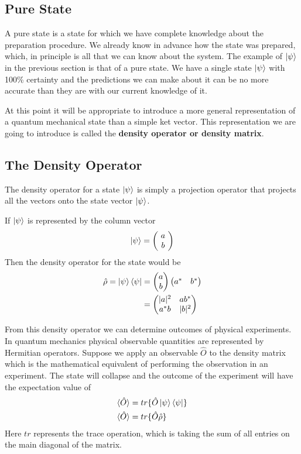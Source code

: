 \subsection{Pure State}
\par A pure state is a state for which we have complete knowledge about the preparation procedure. We already know in advance how the state was prepared, which, in principle is all that we can know about the system. The example of $\Ket{\psi}$ in the previous section is that of a pure state. We have a single state $\Ket{\psi}$ with 100\% certainty and the predictions we can make about it can be no more accurate than they are with our current knowledge of it.
\par At this point it will be appropriate to introduce a more general representation of a quantum mechanical state than a simple ket vector. This representation we are going to introduce is called the \textbf{density operator or density matrix}.
\subsection{The Density Operator}
\par The density operator for a state $\Ket{\psi}$ is simply a projection operator that projects all the vectors onto the state vector $\Ket{\psi}$.
\par If $\Ket{\psi}$ is represented by the column vector
\begin{align*}
\Ket{\psi} = \left(\! \begin{array}{c} a \\ b \end{array} \!\right)
\end{align*}
Then the density operator for the state would be
\begin{align*}
  \hat{\rho} = \Ket{\psi} \Bra{\psi} &= \begin{pmatrix} a \\ b \end{pmatrix} \begin{pmatrix} a^* & b^* \end{pmatrix} \\
  &= \begin{pmatrix} |a|^2 & a b^* \\ a^* b & |b|^2 \end{pmatrix}
\end{align*}
\par From this density operator we can determine outcomes of physical experiments. In quantum mechanics physical observable quantities are represented by Hermitian operators. Suppose we apply an observable $\hat{O}$ to the density matrix which is the mathematical equivalent of performing the observation in an experiment. The state will collapse and the outcome of the experiment will have the expectation value of
\begin{align*}
  \braket{\hat{O}} &= tr\{\hat{O} \Ket{\psi} \Bra{\psi}\} \\
  \braket{\hat{O}} &= tr\{\hat{O} \hat{\rho}\}
\end{align*}
Here $tr$ represents the trace operation, which is taking the sum of all entries on the main diagonal of the matrix.

